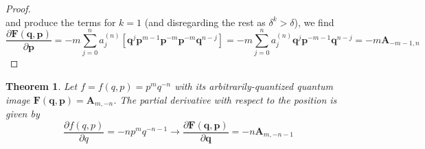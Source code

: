 \documentclass[a4paper]{article}
\newtheorem{theorem}{Theorem}[section]
\theoremstyle{definition}
\begin{document}
\begin{proof}
\begin{equation}
	\end{equation}
	and produce the terms for $k=1$ (and disregarding the rest as $\delta^k>\delta$), we find
	\begin{equation}
		\frac{\partial \textbf{F}(\textbf{q},\textbf{p})}{\partial \textbf{p}}=-m\sum_{j=0}^na_j^{(n)}\left[\textbf{q}^j\textbf{p}^{m-1}\textbf{p}^{-m}\textbf{p}^{-m}\textbf{q}^{n-j}\right]=-m\sum_{j=0}^na_j^{(n)}\textbf{q}^j\textbf{p}^{-m-1}\textbf{q}^{n-j}=-m\textbf{A}_{-m-1,n}
	\end{equation}
\end{proof}

\begin{theorem}
	Let $f=f(q,p)=p^{m}q^{-n}$ with its arbitrarily-quantized quantum image $\textbf{F}(\textbf{q},\textbf{p})=\textbf{A}_{m,-n}$. The partial derivative with respect to the position is given by
	\begin{equation}
		\frac{\partial f(q,p)}{\partial q}=-np^{m}q^{-n-1}\longrightarrow\frac{\partial\textbf{F}(\textbf{q},\textbf{p})}{\partial \textbf{q}}=-n\textbf{A}_{m,-n-1}
	\end{equation}
\end{theorem}
\end{document}
